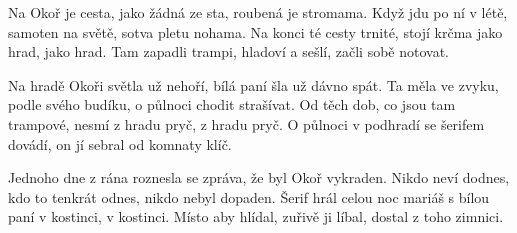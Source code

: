 
\beginverse{}
Na Okoř je cesta, jako žádná ze sta,
roubená je stromama.
Když jdu po ní v létě, samoten na světě,
sotva pletu nohama.
Na konci té cesty trnité,
stojí krčma jako hrad, jako hrad.
Tam zapadli trampi, hladoví a sešlí,
začli sobě notovat.
\endverse{}

\beginchorus{}
Na hradě Okoři světla už nehoří,
bílá paní šla už dávno spát.
Ta měla ve zvyku, podle svého budíku,
o půlnoci chodit strašívat.
Od těch dob, co jsou tam trampové,
nesmí z hradu pryč, z hradu pryč.
O půlnoci v podhradí se šerifem dovádí,
on jí sebral od komnaty klíč.
\endchorus{}

\beginverse{}
Jednoho dne z rána roznesla se zpráva,
že byl Okoř vykraden.
Nikdo neví dodnes, kdo to tenkrát odnes,
nikdo nebyl dopaden.
Šerif hrál celou noc mariáš
s bílou paní v kostinci, v kostinci.
Místo aby hlídal, zuřivě ji líbal,
dostal z toho zimnici.
\endverse{}

\beginchorus{}
\phantom{}
\endchorus{}

\endsong{}
